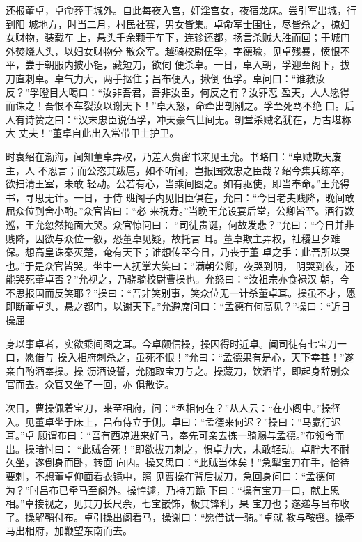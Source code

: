 还报董卓，卓命葬于城外。自此每夜入宫，奸淫宫女，夜宿龙床。尝引军出城，行到阳
城地方，时当二月，村民社赛，男女皆集。卓命军士围住，尽皆杀之，掠妇女财物，装载车
上，悬头千余颗于车下，连轸还都，扬言杀贼大胜而回；于城门外焚烧人头，以妇女财物分
散众军。越骑校尉伍孚，字德瑜，见卓残暴，愤恨不平，尝于朝服内披小铠，藏短刀，欲伺
便杀卓。一日，卓入朝，孚迎至阁下，拔刀直刺卓。卓气力大，两手抠住；吕布便入，揪倒
伍孚。卓问曰：“谁教汝反？”孚瞪目大喝曰：“汝非吾君，吾非汝臣，何反之有？汝罪恶
盈天，人人愿得而诛之！吾恨不车裂汝以谢天下！”卓大怒，命牵出剖剐之。孚至死骂不绝
口。后人有诗赞之曰：“汉末忠臣说伍孚，冲天豪气世间无。朝堂杀贼名犹在，万古堪称大
丈夫！”董卓自此出入常带甲士护卫。

时袁绍在渤海，闻知董卓弄权，乃差人赍密书来见王允。书略曰：“卓贼欺天废主，人
不忍言；而公恣其跋扈，如不听闻，岂报国效忠之臣哉？绍今集兵练卒，欲扫清王室，未敢
轻动。公若有心，当乘间图之。如有驱使，即当奉命。”王允得书，寻思无计。一日，于侍
班阁子内见旧臣俱在，允曰：“今日老夫贱降，晚间敢屈众位到舍小酌。”众官皆曰：“必
来祝寿。”当晚王允设宴后堂，公卿皆至。酒行数巡，王允忽然掩面大哭。众官惊问曰：
“司徒贵诞，何故发悲？”允曰：“今日并非贱降，因欲与众位一叙，恐董卓见疑，故托言
耳。董卓欺主弄权，社稷旦夕难保。想高皇诛秦灭楚，奄有天下；谁想传至今日，乃丧于董
卓之手：此吾所以哭也。”于是众官皆哭。坐中一人抚掌大笑曰：“满朝公卿，夜哭到明，
明哭到夜，还能哭死董卓否？”允视之，乃骁骑校尉曹操也。允怒曰：“汝祖宗亦食禄汉
朝，今不思报国而反笑耶？”操曰：“吾非笑别事，笑众位无一计杀董卓耳。操虽不才，愿
即断董卓头，悬之都门，以谢天下。”允避席问曰：“孟德有何高见？”操曰：“近日操屈

身以事卓者，实欲乘间图之耳。今卓颇信操，操因得时近卓。闻司徒有七宝刀一口，愿借与
操入相府刺杀之，虽死不恨！”允曰：“孟德果有是心，天下幸甚！”遂亲自酌酒奉操。操
沥酒设誓，允随取宝刀与之。操藏刀，饮酒毕，即起身辞别众官而去。众官又坐了一回，亦
俱散讫。

次日，曹操佩着宝刀，来至相府，问：“丞相何在？”从人云：“在小阁中。”操径
入。见董卓坐于床上，吕布侍立于侧。卓曰：“孟德来何迟？”操曰：“马羸行迟耳。”卓
顾谓布曰：“吾有西凉进来好马，奉先可亲去拣一骑赐与孟德。”布领令而出。操暗忖曰：
“此贼合死！”即欲拔刀刺之，惧卓力大，未敢轻动。卓胖大不耐久坐，遂倒身而卧，转面
向内。操又思曰：“此贼当休矣！”急掣宝刀在手，恰待要刺，不想董卓仰面看衣镜中，照
见曹操在背后拔刀，急回身问曰：“孟德何为？”时吕布已牵马至阁外。操惶遽，乃持刀跪
下曰：“操有宝刀一口，献上恩相。”卓接视之，见其刀长尺余，七宝嵌饰，极其锋利，果
宝刀也；遂递与吕布收了。操解鞘付布。卓引操出阁看马，操谢曰：“愿借试一骑。”卓就
教与鞍辔。操牵马出相府，加鞭望东南而去。

